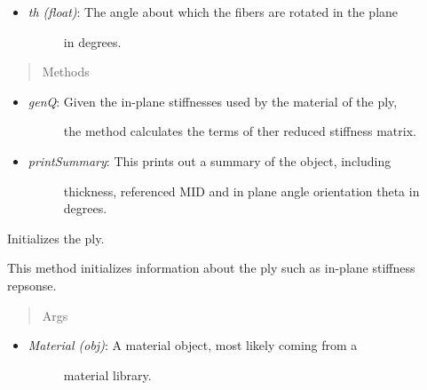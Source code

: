 \documentclass[letterpaper,10pt,english]{sphinxmanual}
\begin{document}
\begin{fulllineitems}
\begin{itemize}
\item {} \begin{description}
\item[{\emph{th (float)}: The angle about which the fibers are rotated in the plane}] \leavevmode
in degrees.

\end{description}

\end{itemize}
\begin{quote}\begin{description}
\item[{Methods}] \leavevmode
\end{description}\end{quote}
\begin{itemize}
\item {} \begin{description}
\item[{\emph{genQ}: Given the in-plane stiffnesses used by the material of the ply,}] \leavevmode
the method calculates the terms of ther reduced stiffness matrix.

\end{description}

\item {} \begin{description}
\item[{\emph{printSummary}: This prints out a summary of the object, including}] \leavevmode
thickness, referenced MID and in plane angle orientation theta in
degrees.

\end{description}

\end{itemize}

\begin{fulllineitems}
\label{structures:AeroComBAT.Structures.Ply.__init__}
Initializes the ply.

This method initializes information about the ply such as in-plane
stiffness repsonse.
\begin{quote}\begin{description}
\item[{Args}] \leavevmode
\end{description}\end{quote}
\begin{itemize}
\item {} \begin{description}
\item[{\emph{Material (obj)}: A material object, most likely coming from a}] \leavevmode
material library.


\end{description}
\end{itemize}
\end{fulllineitems}
\end{fulllineitems}
\end{document}
